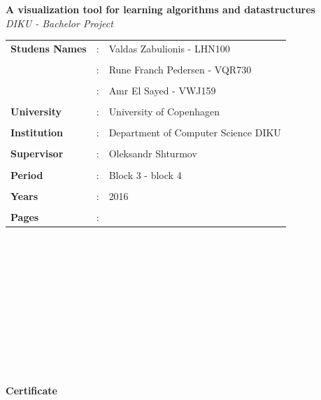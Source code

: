 \documentclass[11pt]{article}
\begin{document}
\clearpage\maketitle
\thispagestyle{empty}
\newpage
\begin{center}{\huge\textbf{A visualization tool for learning algorithms and datastructures}}\newline \textit{\\DIKU - Bachelor Project}\end{center}
\hfill \break
\begin{tabular}{l l l }
\textbf{Studens Names} &: &Valdas Zabulionis - LHN100\\\\
&: &Rune Franch Pedersen - VQR730\\\\
&: &Amr El Sayed - VWJ159\\\\
\textbf{University} &:& University of Copenhagen\\\\
\textbf{Institution} &:& Department of Computer Science DIKU\\\\
\textbf{Supervisor} &:& Oleksandr Shturmov\\\\
\textbf{Period} &:& Block 3 - block 4\\\\
\textbf{Years} &:& 2016\\\\
\textbf{Pages} &:& \\
\end{tabular}
\\\\\\\\\\\\\\\\\\\\
\begin{center}{\huge\textbf{Certificate}}\end{center}
\end{document}
